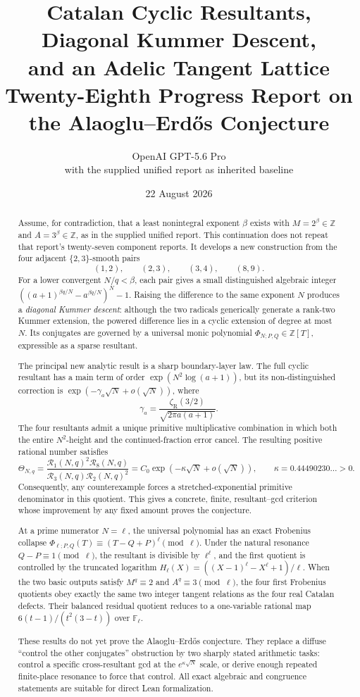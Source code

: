 \documentclass[11pt]{article}
\title{\bfseries Catalan Cyclic Resultants, Diagonal Kummer Descent,\\
and an Adelic Tangent Lattice\\[4pt]
\large Twenty-Eighth Progress Report on the Alaoglu--Erd\H{o}s Conjecture}
\author{OpenAI GPT-5.6 Pro\\with the supplied unified report as inherited baseline}
\date{22 August 2026}
\theoremstyle{definition}
\theoremstyle{remark}
\newcommand{\ZZ}{\mathbb Z}
\newcommand{\FF}{\mathbb F}
\newcommand{\zR}{\zeta_{\!\mathrm R}}
\newcommand{\KappaBalanced}{0.44490230}
\begin{document}
\maketitle

\begin{abstract}
Assume, for contradiction, that a least nonintegral exponent \(\beta\) exists with
\(M=2^\beta\in\ZZ\) and \(A=3^\beta\in\ZZ\), as in the supplied unified report.
This continuation does not repeat that report's twenty-seven component reports.  It develops a new construction from the four adjacent \(\{2,3\}\)-smooth pairs
\[
(1,2),\qquad(2,3),\qquad(3,4),\qquad(8,9).
\]
For a lower convergent \(N/q<\beta\), each pair gives a small distinguished algebraic integer
\(((a+1)^{\beta q/N}-a^{\beta q/N})^N-1\).  Raising the difference to the same exponent \(N\) produces a \emph{diagonal Kummer descent}: although the two radicals generically generate a rank-two Kummer extension, the powered difference lies in a cyclic extension of degree at most \(N\).  Its conjugates are governed by a universal monic polynomial \(\Phi_{N;P,Q}\in\ZZ[T]\), expressible as a sparse resultant.

The principal new analytic result is a sharp boundary-layer law.  The full cyclic resultant has a main term of order \(\exp(N^2\log(a+1))\), but its non-distinguished correction is
\(\exp(-\gamma_a\sqrt N+o(\sqrt N))\), where
\[
\gamma_a=\frac{\zR(3/2)}{\sqrt{2\pi a(a+1)}}.
\]
The four resultants admit a unique primitive multiplicative combination in which both the entire \(N^2\)-height and the continued-fraction error cancel.  The resulting positive rational number satisfies
\[
\Theta_{N,q}
 =\frac{\mathscr R_1(N,q)^2\mathscr R_8(N,q)}
 {\mathscr R_3(N,q)\mathscr R_2(N,q)^2}
 =C_0\exp(-\kappa\sqrt N+o(\sqrt N)),
\qquad \kappa=\KappaBalanced\ldots>0.
\]
Consequently, any counterexample forces a stretched-exponential primitive denominator in this quotient.  This gives a concrete, finite, resultant--gcd criterion whose improvement by any fixed amount proves the conjecture.

At a prime numerator \(N=\ell\), the universal polynomial has an exact Frobenius collapse
\(\Phi_{\ell;P,Q}(T)\equiv(T-Q+P)^\ell\pmod\ell\).  Under the natural resonance \(Q-P\equiv1\pmod\ell\), the resultant is divisible by \(\ell^\ell\), and the first quotient is controlled by the truncated logarithm
\(H_\ell(X)=((X-1)^\ell-X^\ell+1)/\ell\).  When the two basic outputs satisfy
\(M^q\equiv2\) and \(A^q\equiv3\pmod\ell\), the four first Frobenius quotients obey exactly the same two integer tangent relations as the four real Catalan defects.  Their balanced residual quotient reduces to a one-variable rational map
\(6(t-1)/(t^2(3-t))\) over \(\FF_\ell\).

These results do not yet prove the Alaoglu--Erd\H{o}s conjecture.  They replace a diffuse ``control the other conjugates'' obstruction by two sharply stated arithmetic tasks: control a specific cross-resultant gcd at the \(e^{\kappa\sqrt N}\) scale, or derive enough repeated finite-place resonance to force that control.  All exact algebraic and congruence statements are suitable for direct Lean formalization.
\end{abstract}
\end{document}
